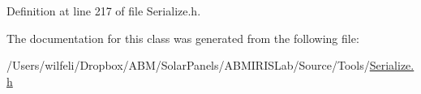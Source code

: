 Definition at line 217 of file Serialize.\+h.



The documentation for this class was generated from the following file\+:\begin{DoxyCompactItemize}
\item 
/\+Users/wilfeli/\+Dropbox/\+A\+B\+M/\+Solar\+Panels/\+A\+B\+M\+I\+R\+I\+S\+Lab/\+Source/\+Tools/\hyperlink{_serialize_8h}{Serialize.\+h}\end{DoxyCompactItemize}
